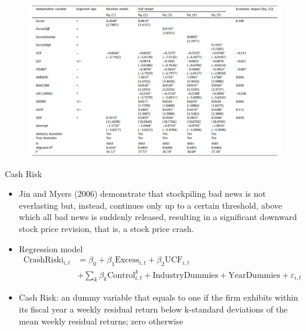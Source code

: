 \documentclass{beamer}
\begin{document}
\begin{frame}
		\begin{figure}
		\centering
		\includegraphics[width=\linewidth]{t4}
		\label{fig:t4}
	\end{figure}
\end{frame}
\begin{frame}{Cash Risk}
	\begin{itemize}
		\item Jin and Myers (2006) demonstrate that stockpiling bad news is not everlasting but, instead, continues only up to a certain threshold, above which all bad news is suddenly released, resulting in a significant downward stock price revision, that is, a stock price crash.
		\item  Regression model
		\begin{equation*}
			\begin{split}
				\text{CrashRiski}_{i,t} & =  \beta_0 + \beta_1\text{Excess}_{i,t}
				+ \beta_2\text{UCF}_{i,t}\\
				& 
				+ \sum_{k}\beta_k \text{Control}_{i,t}^k +
				\text{IndustryDummies} + \text{YearDummies} + \varepsilon_{i,t}
			\end{split}
		\end{equation*}
	\item Cash Risk: an dummy variable that equals to one if the firm exhibits within its fiscal year a weekly
	residual return below k-standard deviations of the mean weekly residual returns; zero otherwise
	\end{itemize}
\end{frame}
\end{document}
